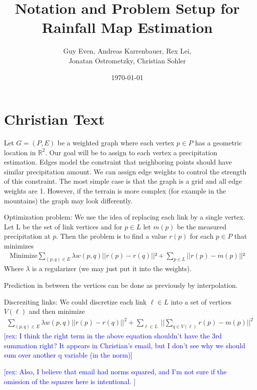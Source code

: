 \documentclass[12pt]{article}
\newcommand{\rex}[1]{\textcolor{blue}{[rex: #1]}}
\begin{document}
\title{Notation and Problem Setup for Rainfall Map Estimation}
\author{Guy Even, Andreas Karrenbauer, Rex Lei,\\ Jonatan Ostrometzky, Christian Sohler}
\date{\today}
\maketitle
\section*{Christian Text}
Let $G = (P,E)$  be a weighted graph where each vertex $p\in P$ has a 
geometric location in $\mathbb{R}^2$. Our goal will be to assign to each vertex a 
precipitation estimation. Edges model the constraint that neighboring 
points should have similar precipitation amount. We can assign edge 
weights to control the strength of this constraint.
The most simple case is that the graph is a grid and all edge weights 
are 1. However, if the terrain is more complex (for example in the 
mountains) the graph may look differently.

Optimization problem:
We use the idea of replacing each link by a single vertex. Let L be 
the set of link vertices and for $p\in L$ let $m(p)$ be the measured 
precipitation at $p$. Then the problem is to find a value $r(p)$ for each 
$p \in P$ that minimizes
\begin{align}
    \text{Minimize}  \sum_{(p,q) \in E} \lambda w(p,q) ||r(p)-r(q)||² + 
\sum_{p\in L} ||r(p)-m(p)||²
\end{align}
Where $\lambda$ is a regularizer (we may just put it into the weights).

Prediction in between the vertices can be done as previously by interpolation.

Discreziting links:
We could discretize each link $\ell \in L$ into a set of vertices 
$V(\ell)$ and then minimize
\begin{align}
\sum_{(p,q) \in E} \lambda w(p,q) ||r(p)-r(q)||^2 + \sum_{\ell\in L}   \
||\sum_{q\in V(\ell)}r(p) - m(p)||^2
\end{align}
\rex{I think the right term in the above equation shouldn't have the 3rd summation right? It appears in Christian's email, but I don't see why we should sum over another q variable (in the norm)}


\rex{Also, I believe that email had norms squared, and I'm not sure if the omission of the squares here is intentional. }
\end{document}
